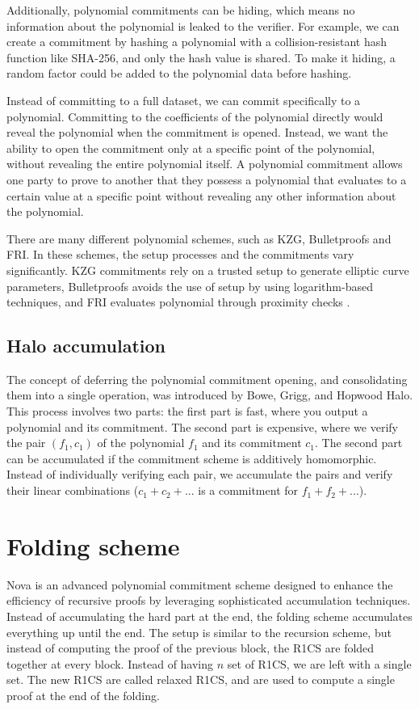 Additionally, polynomial commitments can be hiding, which means no information about the polynomial is leaked to the verifier.
For example, we can create a commitment by hashing a polynomial with a collision-resistant hash function like SHA-256, and only the hash value is shared. 
To make it hiding, a random factor could be added to the polynomial data before hashing.

Instead of committing to a full dataset, we can commit specifically to a polynomial. 
Committing to the coefficients of the polynomial directly would reveal the polynomial when the commitment is opened. 
Instead, we want the ability to open the commitment only at a specific point of the polynomial, without revealing the entire polynomial itself. 
A polynomial commitment allows one party to prove to another that they possess a polynomial that evaluates to a certain value at a specific point without revealing any other information about the polynomial.
\cite{VR23}

There are many different polynomial schemes, such as KZG, Bulletproofs and FRI. 
In these schemes, the setup processes and the commitments vary significantly. 
KZG commitments rely on a trusted setup to generate elliptic curve parameters\cite{KZG}, Bulletproofs avoids the use of setup by using logarithm-based techniques\cite{BP18}, 
and FRI evaluates polynomial through proximity checks\cite{FRI} .

\subsection{Halo accumulation}

The concept of deferring the polynomial commitment opening, and consolidating them into a single operation, was introduced by Bowe, Grigg, and Hopwood Halo.\cite{BGH23}
This process involves two parts:
the first part is fast, where you output a polynomial and its commitment.
The second part is expensive, where we verify the pair $(f_1, c_1)$ of the polynomial $f_1$ and its commitment $c_1$.
The second part can be accumulated if the commitment scheme is additively homomorphic.
Instead of individually verifying each pair, we accumulate the pairs and verify their linear combinations ($c_1+c_2+...$ is a commitment for $f_1+f_2+...$). \cite{VR23}

\section{Folding scheme}
Nova is an advanced polynomial commitment scheme designed to enhance the efficiency of recursive proofs by leveraging sophisticated accumulation techniques.
Instead of accumulating the hard part at the end, the folding scheme accumulates everything up until the end.
The setup is similar to the recursion scheme, but instead of computing the proof of the previous block, the R1CS are folded together at every block.
Instead of having $n$ set of R1CS, we are left with a single set. The new R1CS are called relaxed R1CS, and are used to compute a single proof at the end of the folding.
\cite{Nova23}  \cite{ASI23}


